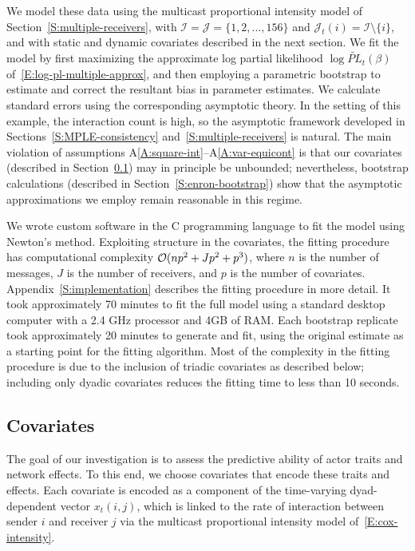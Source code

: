 \documentclass[final]{statsoc}
\begin{document}
We model these data using the multicast proportional intensity
model of Section~\ref{S:multiple-receivers}, with
$\mathcal{I} = \mathcal{J} = \{ 1, 2, \ldots, 156 \}$ and
$\mathcal{J}_t(i) = \mathcal{I} \setminus \{ i \}$, and with static and
dynamic covariates described in the next section.
We fit the model by first maximizing the approximate log partial
likelihood $\log \widetilde{\mathit{PL}}_t(\beta)$ of~\eqref{E:log-pl-multiple-approx}, and then employing a
parametric bootstrap to estimate and correct the resultant bias in
parameter estimates.  We calculate standard errors using the
corresponding asymptotic theory.
In the setting of this example, the interaction count is high, so
the asymptotic framework developed in Sections~\ref{S:MPLE-consistency}
and~\ref{S:multiple-receivers} is natural.  The main violation of assumptions
A\ref{A:square-int}--A\ref{A:var-equicont} is that our covariates (described in Section~\ref{S:enron-covariates}) may
in principle be unbounded; nevertheless, bootstrap calculations
(described in Section~\ref{S:enron-bootstrap}) show that the asymptotic approximations we employ remain reasonable in this regime.

We wrote custom software in the C programming language to fit the model using
Newton's method.  Exploiting structure in the covariates, the fitting
procedure has computational complexity $\mathcal{O}(n p^2 + J p^2 + p^3)$, where $n$ is
the number of messages, $J$ is the number of receivers, and $p$ is the number
of covariates.  Appendix~\ref{S:implementation} describes the fitting
procedure in more detail.  It took approximately 70 minutes to fit the full
model using a standard desktop computer with a 2.4 GHz processor and 4GB of RAM.  Each bootstrap replicate took
approximately 20 minutes to generate and fit, using the original estimate as a
starting point for the fitting algorithm.  Most of the complexity in the
fitting procedure is due to the inclusion of triadic covariates as described below; including only dyadic covariates reduces the fitting time to less than 10 seconds.

\subsection{Covariates}\label{S:enron-covariates}

The goal of our investigation is to assess the predictive ability of actor traits and network effects.  To this end, we choose covariates that encode these traits and effects.  Each covariate is encoded as a component of the time-varying dyad-dependent vector $x_t(i,j)$, which is linked to the rate of interaction between sender $i$ and receiver $j$ via the multicast proportional intensity model of~\eqref{E:cox-intensity}.
\end{document}
